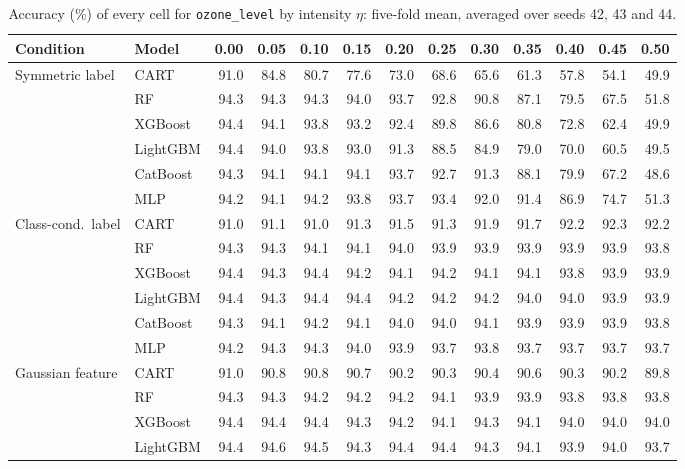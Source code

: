 \begin{table}[p]
\centering
\tiny
\setlength{\tabcolsep}{2.6pt}
\caption{Accuracy (\%) of every cell for \texttt{ozone\_level} by intensity $\eta$: five-fold mean, averaged over seeds 42, 43 and 44.}
\label{tab:grid_ozone_level}
\begin{tabular}{@{}llrrrrrrrrrrr@{}}
\toprule
Condition & Model & 0.00 & 0.05 & 0.10 & 0.15 & 0.20 & 0.25 & 0.30 & 0.35 & 0.40 & 0.45 & 0.50 \\
\midrule
Symmetric label & CART & 91.0 & 84.8 & 80.7 & 77.6 & 73.0 & 68.6 & 65.6 & 61.3 & 57.8 & 54.1 & 49.9 \\
 & RF & 94.3 & 94.3 & 94.3 & 94.0 & 93.7 & 92.8 & 90.8 & 87.1 & 79.5 & 67.5 & 51.8 \\
 & XGBoost & 94.4 & 94.1 & 93.8 & 93.2 & 92.4 & 89.8 & 86.6 & 80.8 & 72.8 & 62.4 & 49.9 \\
 & LightGBM & 94.4 & 94.0 & 93.8 & 93.0 & 91.3 & 88.5 & 84.9 & 79.0 & 70.0 & 60.5 & 49.5 \\
 & CatBoost & 94.3 & 94.1 & 94.1 & 94.1 & 93.7 & 92.7 & 91.3 & 88.1 & 79.9 & 67.2 & 48.6 \\
 & MLP & 94.2 & 94.1 & 94.2 & 93.8 & 93.7 & 93.4 & 92.0 & 91.4 & 86.9 & 74.7 & 51.3 \\
\midrule
Class-cond.\ label & CART & 91.0 & 91.1 & 91.0 & 91.3 & 91.5 & 91.3 & 91.9 & 91.7 & 92.2 & 92.3 & 92.2 \\
 & RF & 94.3 & 94.3 & 94.1 & 94.1 & 94.0 & 93.9 & 93.9 & 93.9 & 93.9 & 93.9 & 93.8 \\
 & XGBoost & 94.4 & 94.3 & 94.4 & 94.2 & 94.1 & 94.2 & 94.1 & 94.1 & 93.8 & 93.9 & 93.9 \\
 & LightGBM & 94.4 & 94.3 & 94.4 & 94.4 & 94.2 & 94.2 & 94.2 & 94.0 & 94.0 & 93.9 & 93.9 \\
 & CatBoost & 94.3 & 94.1 & 94.2 & 94.1 & 94.0 & 94.0 & 94.1 & 93.9 & 93.9 & 93.9 & 93.8 \\
 & MLP & 94.2 & 94.3 & 94.3 & 94.0 & 93.9 & 93.7 & 93.8 & 93.7 & 93.7 & 93.7 & 93.7 \\
\midrule
Gaussian feature & CART & 91.0 & 90.8 & 90.8 & 90.7 & 90.2 & 90.3 & 90.4 & 90.6 & 90.3 & 90.2 & 89.8 \\
 & RF & 94.3 & 94.3 & 94.2 & 94.2 & 94.2 & 94.1 & 93.9 & 93.9 & 93.8 & 93.8 & 93.8 \\
 & XGBoost & 94.4 & 94.4 & 94.4 & 94.3 & 94.2 & 94.1 & 94.3 & 94.1 & 94.0 & 94.0 & 94.0 \\
 & LightGBM & 94.4 & 94.6 & 94.5 & 94.3 & 94.4 & 94.4 & 94.3 & 94.1 & 93.9 & 94.0 & 93.7 \\

\end{tabular}
\end{table}
